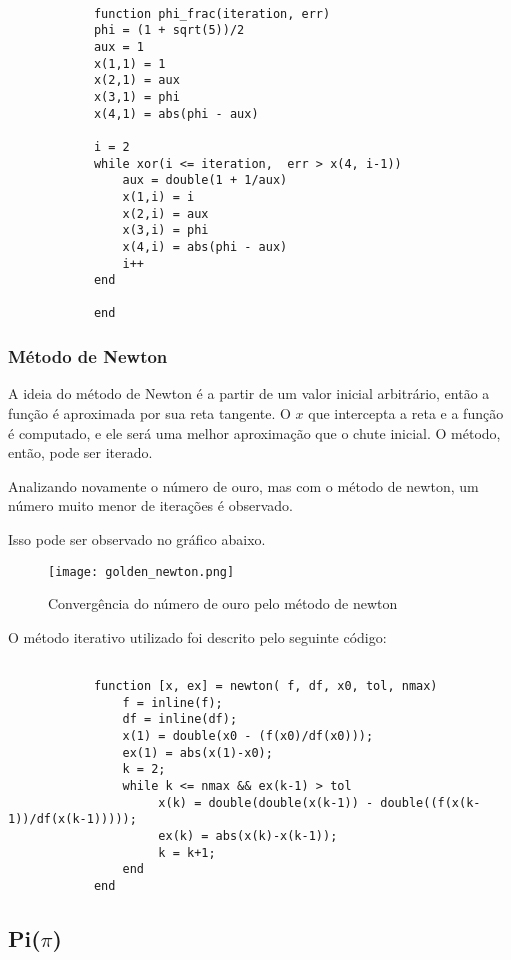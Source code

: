 			\begin{lstlisting}

			function phi_frac(iteration, err)
			phi = (1 + sqrt(5))/2
			aux = 1
			x(1,1) = 1
			x(2,1) = aux
			x(3,1) = phi
			x(4,1) = abs(phi - aux)

			i = 2
			while xor(i <= iteration,  err > x(4, i-1))
				aux = double(1 + 1/aux)
				x(1,i) = i
				x(2,i) = aux
				x(3,i) = phi
				x(4,i) = abs(phi - aux)
				i++
			end

			end

			\end{lstlisting}

		\subsubsection{Método de Newton}

			A ideia do método de Newton é a partir de um valor inicial
			arbitrário, então a função é aproximada por sua reta tangente. O $x$
			que intercepta a reta e a função é computado, e ele será uma melhor
			aproximação que o chute inicial. O método, então, pode ser iterado.

			Analizando novamente o número de ouro, mas com o método de newton,
			um número muito menor de iterações é observado.

			

			Isso pode ser observado no gráfico abaixo.

			\begin{figure}[H]
				\centering
				\texttt{[image: golden\_newton.png]}
				\caption{Convergência do número de ouro pelo método de newton}
				\label{golden_newton}
			\end{figure}

			O método iterativo utilizado foi descrito pelo seguinte código:

			\begin{lstlisting}

			function [x, ex] = newton( f, df, x0, tol, nmax)
				f = inline(f);
				df = inline(df);
				x(1) = double(x0 - (f(x0)/df(x0)));
				ex(1) = abs(x(1)-x0);
				k = 2;
				while k <= nmax && ex(k-1) > tol
					 x(k) = double(double(x(k-1)) - double((f(x(k-1))/df(x(k-1)))));
					 ex(k) = abs(x(k)-x(k-1));
					 k = k+1;
				end
			end

			\end{lstlisting}

	\subsection{Pi($\pi$)}

